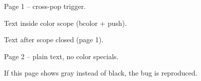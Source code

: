 \documentclass[dvipdfmx,a5paper]{article}
\begin{document}
Page 1 -- cross-pop trigger.


Text inside color scope (bcolor + push).



Text after scope closed (page 1).

\newpage


Page 2 -- plain text, no color specials.

If this page shows gray instead of black, the bug is reproduced.
\end{document}

